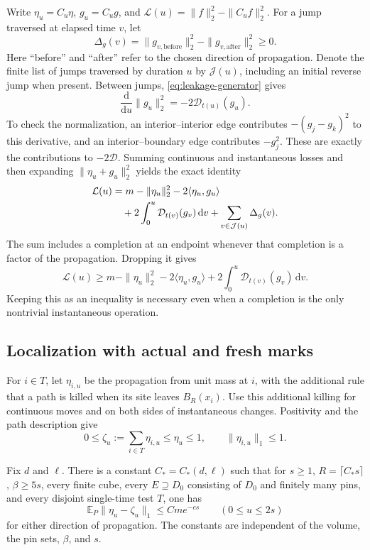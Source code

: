 Write $\eta_u=C_u\eta$,
$g_u=C_ug$, and
$\mathcal L(u)=\|f\|_2^2-\|C_uf\|_2^2$.
For a jump traversed at elapsed time $v$, let
\[
 \Delta_g(v)=\|g_{v,\mathrm{before}}\|_2^2
                  -\|g_{v,\mathrm{after}}\|_2^2\ge0.
\]
Here ``before'' and ``after'' refer to the chosen direction of
propagation.  Denote the finite list of jumps traversed by duration
$u$ by $\mathcal J(u)$, including an initial reverse jump when present.
Between jumps, \eqref{eq:leakage-generator} gives
\[
 \frac{\mathrm d}{\mathrm du}\|g_u\|_2^2
     =-2\mathcal D_{t(u)}(g_u).
\]
To check the normalization, an interior--interior edge contributes
$-(g_j-g_k)^2$ to this derivative, and an interior--boundary edge
contributes $-g_j^2$.  These are exactly the contributions to
$-2\mathcal D$.  Summing continuous and instantaneous losses and then
expanding $\|\eta_u+g_u\|_2^2$ yields the exact identity
\begin{align}
 \mathcal L(u)
 &=m-\|\eta_u\|_2^2-2\langle\eta_u,g_u\rangle\notag\\
 &\quad+2\int_0^u\mathcal D_{t(v)}(g_v)\,\mathrm dv
       +\sum_{v\in\mathcal J(u)}\Delta_g(v).
       \label{eq:exact-loss}
\end{align}
The sum includes a completion at an endpoint whenever that completion
is a factor of the propagation.  Dropping it gives
\begin{equation}\label{eq:loss-lower}
 \mathcal L(u)\ge
 m-\|\eta_u\|_2^2-2\langle\eta_u,g_u\rangle
       +2\int_0^u\mathcal D_{t(v)}(g_v)\,\mathrm dv.
\end{equation}
Keeping this as an inequality is necessary even when a completion is
the only nontrivial instantaneous operation.

\subsection{Localization with actual and fresh marks}

For $i\in T$, let $\eta_{i,u}$ be the propagation from unit mass at $i$,
with the additional rule that a path is killed when its site leaves
$B_R(x_i)$.  Use this additional killing for continuous moves and on
both sides of instantaneous changes.  Positivity and the path
description give
\begin{equation}\label{eq:local-pieces}
 0\le\zeta_u:=\sum_{i\in T}\eta_{i,u}\le\eta_u\le1,
 \qquad \|\eta_{i,u}\|_1\le1.
\end{equation}

\begin{lemma}\label{lem:localization}
Fix $d$ and $\ell$.  There is a constant $C_*=C_*(d,\ell)$ such that
for $s\ge1$, $R=\lceil C_*s\rceil$, $\beta\ge5s$, every finite
cube, every $E\supseteq D_0$ consisting of $D_0$ and finitely many
pins, and every disjoint single-time test $T$, one has
\begin{equation}\label{eq:localization}
 \mathbb E_P\|\eta_u-\zeta_u\|_1\le C m e^{-cs}
       \qquad(0\le u\le2s)
\end{equation}
for either direction of propagation.  The constants are independent of
the volume, the pin sets, $\beta$, and $s$.
\end{lemma}

